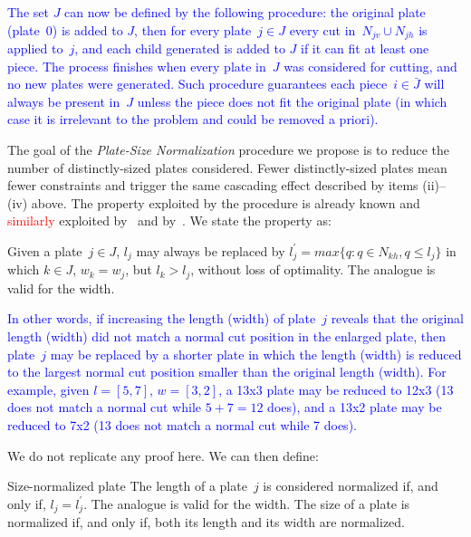 \documentclass[ppgc,tese,english,formais,babel]{iiufrgs}
\newif\iffinalversion
\newcommand{\newtext}[1]{\iffinalversion%
#1%
\else%
\textcolor{blue}{#1}%
\fi%
}
\newcommand{\oldtext}[1]{\iffinalversion%
\else%
\textcolor{red}{#1}%
\fi%
}
\begin{document}
\newtext{
The set \(J\) can now be defined by the following procedure: the original plate (plate~\(0\)) is added to \(J\), then for every plate~\(j \in J\) every cut in~\(N_{jv} \cup N_{jh}\) is applied to~\(j\), and each child generated is added to \(J\) if it can fit at least one piece.
The process finishes when every plate in~\(J\) was considered for cutting, and no new plates were generated.
Such procedure guarantees each piece~\(i \in \bar{J}\) will always be present in~\(J\) unless the piece does not fit the original plate (in which case it is irrelevant to the problem and could be removed a priori).
}

The goal of the \emph{Plate-Size Normalization} procedure we propose is to reduce the number of distinctly-sized plates considered.
Fewer distinctly-sized plates mean fewer constraints and trigger the same cascading effect described by items (ii)--(iv) above.
The property exploited by the procedure is already known and \oldtext{similarly} exploited by~\citet{alvarez:2009} and by~\citet{dolatabadi:2012}.
We state the property as:

\begin{proposition}
\label{pro:normalization}
Given a plate~\(j \in J\), \(l_j\) may always be replaced by \(l^\prime_j = max\{q : q \in N_{kh}, q \leq l_j\}\) in which \(k \in J\), \(w_k = w_j\), but \(l_k > l_j\), without loss of optimality.
The analogue is valid for the width.
\end{proposition}

\newtext{In other words, if increasing the length (width) of plate~\(j\) reveals that the original length (width) did not match a normal cut position in the enlarged plate, then plate~\(j\) may be replaced by a shorter plate in which the length (width) is reduced to the largest normal cut position smaller than the original length (width). For example, given \(l = [5, 7]\), \(w = [3, 2]\), a 13x3 plate may be reduced to 12x3 (13 does not match a normal cut while \(5 + 7 = 12\) does), and a 13x2 plate may be reduced to 7x2 (13 does not match a normal cut while 7 does).}
We do not replicate any proof here. We can then define:

\begin{definition}{Size-normalized plate}
The length of a plate~\(j\) is considered normalized if, and only if, \(l_j = l^\prime_j\).
The analogue is valid for the width.
The size of a plate is normalized if, and only if, both its length and its width are normalized.
\end{definition}
\end{document}
